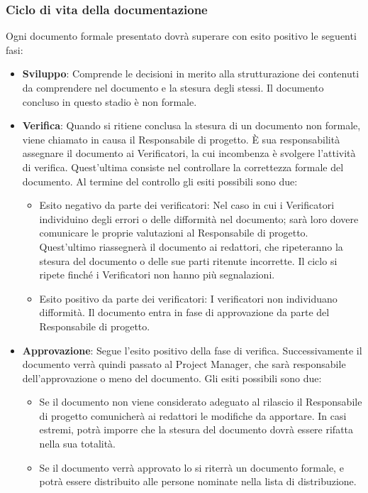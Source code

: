 \subsubsection{Ciclo di vita della documentazione}
Ogni documento formale presentato dovrà superare con esito positivo le seguenti fasi:
    \begin{itemize}
        \item \textbf{Sviluppo}: Comprende le decisioni in merito alla strutturazione dei contenuti da comprendere nel documento e la stesura degli stessi. Il documento concluso in questo stadio è non formale. 
        
        \item \textbf{Verifica}: Quando si ritiene conclusa la stesura di un documento non formale, viene chiamato in causa il Responsabile di progetto. È sua responsabilità assegnare il documento ai Verificatori, la cui incombenza è svolgere l'attività di verifica. Quest'ultima consiste nel controllare la correttezza formale del documento. Al termine del controllo gli esiti possibili sono due:
            \begin{itemize}
                \item Esito negativo da parte dei verificatori: Nel caso in cui i Verificatori individuino degli errori o delle difformità nel documento; sarà loro dovere comunicare le proprie valutazioni al Responsabile di progetto. Quest'ultimo riassegnerà il documento ai redattori, che ripeteranno la stesura del documento o delle sue parti ritenute incorrette. Il ciclo si ripete finché i Verificatori non hanno più segnalazioni.
                \item Esito positivo da parte dei verificatori: I verificatori non individuano difformità. Il documento entra in fase di approvazione da parte del Responsabile di progetto.
            \end{itemize}
        
        \item \textbf{Approvazione}: Segue l'esito positivo della fase di verifica.
        Successivamente il documento verrà quindi passato al Project Manager, che sarà responsabile dell'approvazione o meno del documento. Gli esiti possibili sono due:
            \begin{itemize}
                \item Se il documento non viene considerato adeguato al rilascio il Responsabile di progetto comunicherà ai
                redattori le modifiche da apportare. In casi estremi, potrà imporre che la stesura del documento dovrà essere rifatta nella sua totalità.
                \item Se il documento verrà approvato lo si riterrà un documento formale, e potrà essere distribuito alle persone nominate nella lista di distribuzione.
            \end{itemize}
    \end{itemize}
